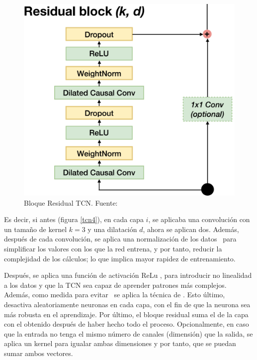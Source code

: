 \begin{figure}[H]
    \centering
    \includegraphics[scale = 0.35]{imgs/tcn5.png}
    \caption{Bloque Residual TCN. \scriptsize{Fuente: \parencite{TCNSeq}}}
    \label{tcn5}
\end{figure}

Es decir, si antes (figura \ref{tcn4}), en cada capa $i$, se aplicaba una convolución con un tamaño de kernel $k = 3$ y una dilatación $d$, ahora se aplican dos. Además, después de cada convolución, se aplica una normalización de los datos \parencite{weightNormalization}\fnm\ para simplificar los valores con los que la red entrena, y por tanto, reducir la complejidad de los cálculos; lo que implica mayor rapidez de entrenamiento. 

Después, se aplica una función de activación ReLu \parencite{ReLu}, para introducir no linealidad a los datos y que la TCN sea capaz de aprender patrones más complejos. Además, como medida para evitar \fnm\ se aplica la técnica de  \parencite{dropout}. Esto último, desactiva aleatoriamente neuronas en cada capa, con el fin de que la neurona sea más robusta en el aprendizaje. Por último, el bloque residual suma el  de la  capa con el  obtenido después de haber hecho todo el proceso. Opcionalmente, en caso que la entrada no tenga el mismo número de canales (dimensión) que la salida, se aplica un kernel para igualar ambas dimensiones y por tanto, que se puedan sumar ambos vectores.

